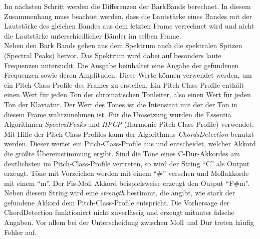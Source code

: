 \documentclass[11pt,a4paper]{article}
\begin{document}
Im nächsten Schritt werden die Differenzen der BarkBands berechnet. In diesem Zusammenhang muss beachtet werden, dass die Lautstärke eines Bandes mit der Lautstärke des gleichen Bandes aus dem letzten Frame verrechnet wird und nicht die Lautstärke unterschiedlicher Bänder im selben Frame.\\
Neben den Bark Bands gehen aus dem Spektrum auch die spektralen Spitzen (Spectral Peaks) hervor. Das Spektrum wird dabei auf besonders laute Frequenzen untersucht. Die Ausgabe beinhaltet eine Angabe der gefundenen Frequenzen sowie deren Amplituden. Diese Werte können verwendet werden, um ein Pitch-Class-Profile des Frames zu erstellen. Ein Pitch-Class-Profile enthält einen Wert für jeden Ton der chromatischen Tonleiter, also einen Wert für jeden Ton der Klaviatur. Der Wert des Tones ist die Intensität mit der der Ton in diesem Frame wahrzunehmen ist. Für die Umsetzung wurden die Essentia Algorithmen \textit{SpectralPeaks} und \textit{HPCP} (Harmonic Pitch Class Profile) verwendet.\\
Mit Hilfe der Pitch-Class-Profiles kann der Algorithmus \textit{ChordsDetection} benutzt werden. Dieser wertet ein Pitch-Class-Profile aus und entscheidet, welcher Akkord die größte Übereinstimmung ergibt. Sind die Töne eines C-Dur-Akkordes am deutlichsten im Pitch-Class-Profile vertreten, so wird der String ``C'' als Output erzeugt. Töne mit Vorzeichen werden mit einem ``\#'' versehen und Mollakkorde mit einem ``m''. Der Fis-Moll Akkord beispielsweise erzeugt den Output ``F\#m''. Neben diesem String wird eine \textit{strength} bestimmt, die angibt, wie stark der gefundene Akkord dem Pitch-Class-Profile entspricht. Die Vorhersage der ChordDetection funktioniert nicht zuverlässig und erzeugt mitunter falsche Angaben. Vor allem bei der Unterscheidung zwischen Moll und Dur treten häufig Fehler auf.
\end{document}
